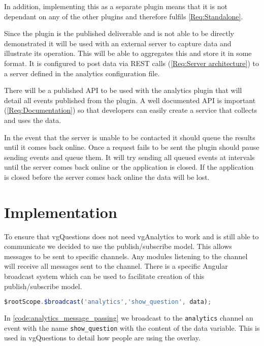 In addition, implementing this as a separate plugin means that it is not dependant on any of the other plugins and therefore fulfils \cref{Req:Standalone}.

Since the plugin is the published deliverable and is not able to be directly demonstrated it will be used with an external server to capture data and illustrate its operation. This will be able to aggregates this and store it in some format. It is configured to post data via \gls{REST} calls (\cref{Req:Server architecture}) to a server defined in the analytics configuration file.

There will be a published \gls{API} to be used with the analytics plugin that will detail all events published from the plugin. A well documented API is important (\cref{Req:Documentation}) so that developers can easily create a service that collects and uses the data.

In the event that the server is unable to be contacted it should queue the results until it comes back online. Once a request fails to be sent the plugin should pause sending events and queue them. It will try sending all queued events at intervals until the server comes back online or the application is closed. If the application is closed before the server comes back online the data will be lost.

\section{Implementation}

To ensure that vgQuestions does not need vgAnalytics to work and is still able to communicate we decided to use the publish/subscribe model. This allows messages to be sent to specific channels. Any modules listening to the channel will receive all messages sent to the channel. There is a specific Angular broadcast system which can be used to facilitate creation of this publish/subscribe model.

\begin{lstlisting}[language=javascript,caption={AngularJS demonstrating the message passing interface used in the Analytics plugin},label={code:analytics_message_passing}]
$rootScope.$broadcast('analytics','show_question', data);
\end{lstlisting}

In \autoref{code:analytics_message_passing} we broadcast to the \lstinline|analytics| channel an event with the name
\lstinline|show_question| with the content of the data variable. This is used in \gls{vgQuestions} to detail how people are using the overlay.

